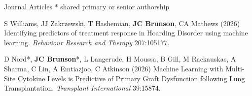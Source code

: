 \documentclass[10pt,a4paper]{article}
\begin{document}

\vspace{.25cm}
{\sc Journal Articles}\newline
* shared primary or senior authorship
\begin{enumerate}[label={[\arabic*]},labelindent=1cm,nolistsep]
\item
S Williams, JJ Zakrzewski, T Hashemian, {\bfseries JC Brunson}, CA Mathews (2026) Identifying predictors of treatment response in Hoarding Disorder using machine learning. {\itshape Behaviour Research and Therapy} 207:105177.
\item
D Nord*, {\bfseries JC Brunson}*, L Langerude, H Moussa, B Gill, M Rackauskas, A Sharma, C Lin, A Emtiazjoo, C Atkinson (2026) Machine Learning with Multi-Site Cytokine Levels is Predictive of Primary Graft Dysfunction following Lung Transplantation. {\itshape Transplant International} 39:15874.

\end{enumerate}
\end{document}
